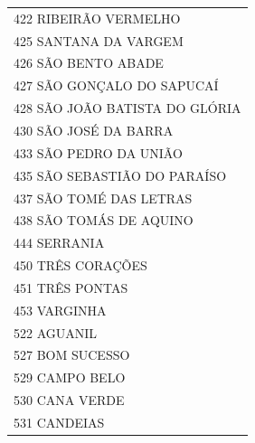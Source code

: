 \documentclass{article}
\begin{document}
\begin{longtable}[c]{m{18cm}}
\multicolumn{1}{l}{ \hspace{2em} 422 RIBEIRÃO VERMELHO } \\
\multicolumn{1}{l}{ \hspace{2em} 425 SANTANA DA VARGEM } \\
\multicolumn{1}{l}{ \hspace{2em} 426 SÃO BENTO ABADE } \\
\multicolumn{1}{l}{ \hspace{2em} 427 SÃO GONÇALO DO SAPUCAÍ } \\
\multicolumn{1}{l}{ \hspace{2em} 428 SÃO JOÃO BATISTA DO GLÓRIA } \\
\multicolumn{1}{l}{ \hspace{2em} 430 SÃO JOSÉ DA BARRA } \\
\multicolumn{1}{l}{ \hspace{2em} 433 SÃO PEDRO DA UNIÃO } \\
\multicolumn{1}{l}{ \hspace{2em} 435 SÃO SEBASTIÃO DO PARAÍSO } \\
\multicolumn{1}{l}{ \hspace{2em} 437 SÃO TOMÉ DAS LETRAS } \\
\multicolumn{1}{l}{ \hspace{2em} 438 SÃO TOMÁS DE AQUINO } \\
\multicolumn{1}{l}{ \hspace{2em} 444 SERRANIA } \\
\multicolumn{1}{l}{ \hspace{2em} 450 TRÊS CORAÇÕES } \\
\multicolumn{1}{l}{ \hspace{2em} 451 TRÊS PONTAS } \\
\multicolumn{1}{l}{ \hspace{2em} 453 VARGINHA } \\
\multicolumn{1}{l}{ \hspace{2em} 522 AGUANIL } \\
\multicolumn{1}{l}{ \hspace{2em} 527 BOM SUCESSO } \\
\multicolumn{1}{l}{ \hspace{2em} 529 CAMPO BELO } \\
\multicolumn{1}{l}{ \hspace{2em} 530 CANA VERDE } \\
\multicolumn{1}{l}{ \hspace{2em} 531 CANDEIAS } \\

\end{longtable}
\end{document}
